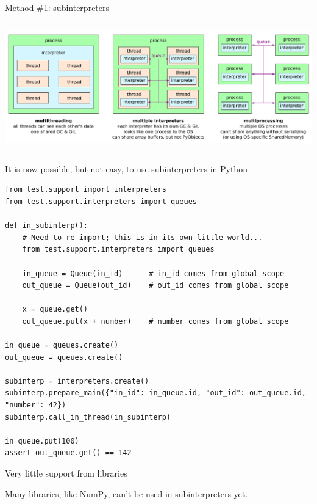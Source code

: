 \documentclass[aspectratio=169]{beamer}
\begin{document}
\begin{frame}{Method \#1: subinterpreters}
\large
\vspace{0.5 cm}
\begin{columns}
\includegraphics[width=\linewidth]{img/thread-interpreter-process.pdf}
\end{columns}

\vspace{0.5 cm}
\end{frame}

\begin{frame}[fragile]{It is now possible, but not easy, to use subinterpreters in Python}
\vspace{0.35 cm}
\scriptsize
\begin{verbatim}
from test.support import interpreters
from test.support.interpreters import queues

def in_subinterp():
    # Need to re-import; this is in its own little world...
    from test.support.interpreters import queues

    in_queue = Queue(in_id)      # in_id comes from global scope
    out_queue = Queue(out_id)    # out_id comes from global scope

    x = queue.get()
    out_queue.put(x + number)    # number comes from global scope

in_queue = queues.create()
out_queue = queues.create()

subinterp = interpreters.create()
subinterp.prepare_main({"in_id": in_queue.id, "out_id": out_queue.id, "number": 42})
subinterp.call_in_thread(in_subinterp)

in_queue.put(100)
assert out_queue.get() == 142
\end{verbatim}
\end{frame}

\begin{frame}{Very little support from libraries}
\vspace{1 cm}
\Large

\begin{center}
Many libraries, like NumPy, can't be used in subinterpreters yet.

\vspace{1 cm}
\end{center}
\end{frame}
\end{document}

